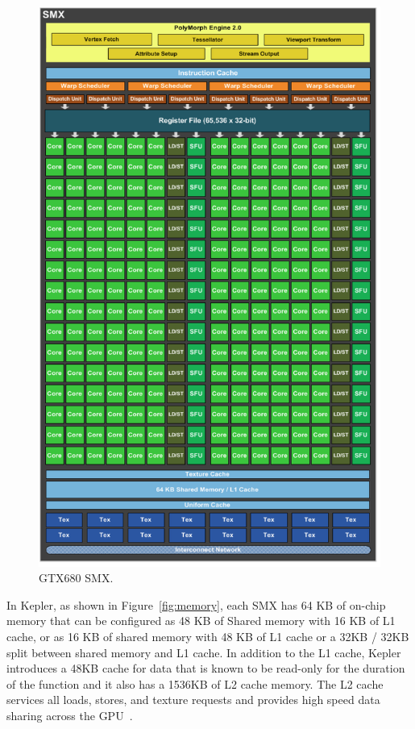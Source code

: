 \begin{figure} [H]
    \centering
    \vspace{0.5in}
    \includegraphics[scale=0.50]{Images/gpu_architecture}
    \vspace{0.5in}
    \caption{GTX680 SMX.}
    \label{fig:gpu_architecture}
\end{figure}

In Kepler, as shown in Figure~\ref{fig:memory}, each SMX has 64 KB of on-chip memory that can be configured as 48 KB of Shared memory with 16 KB of L1 cache, or as 16 KB of shared memory with 48 KB of L1 cache or a 32KB / 32KB split between shared memory and L1 cache.
In addition to the L1 cache, Kepler introduces a 48KB cache for data that is known to be read-only for the duration of the function and it also has a 1536KB of L2 cache memory.  The L2 cache services all loads, stores, and texture requests and provides high speed data sharing across the GPU~\cite{nvidia:12:gk110}.

